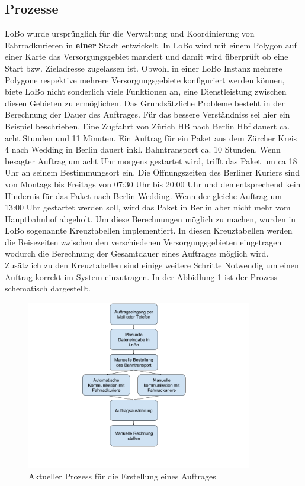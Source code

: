 \subsection{Prozesse}
\label{subsec:prozess}
LoBo wurde ursprünglich für die Verwaltung und Koordinierung von Fahrradkurieren in \textbf{einer} Stadt entwickelt. In LoBo wird mit einem Polygon auf einer Karte das Versorgungsgebiet markiert und damit wird überprüft ob eine Start bzw. Zieladresse zugelassen ist. Obwohl in einer LoBo Instanz mehrere Polygone respektive mehrere Versorgungsgebiete konfiguriert werden können, biete LoBo nicht sonderlich viele Funktionen an, eine Dienstleistung zwischen diesen Gebieten zu ermöglichen. Das Grundsätzliche Probleme besteht in der Berechnung der Dauer des Auftrages. Für das bessere Verständniss sei hier ein Beispiel beschrieben. Eine Zugfahrt von Zürich HB nach Berlin Hbf dauert ca. acht Stunden und 11 Minuten. Ein Auftrag für ein Paket aus dem Zürcher Kreis 4 nach Wedding in Berlin dauert inkl. Bahntransport ca. 10 Stunden. Wenn besagter Auftrag um acht Uhr morgens gestartet wird, trifft das Paket um ca 18 Uhr an seinem Bestimmungsort ein. Die Öffnungszeiten des Berliner Kuriers sind von Montags bis Freitags von 07:30 Uhr bis 20:00 Uhr und dementsprechend kein Hindernis für das Paket nach Berlin Wedding. Wenn der gleiche Auftrag um 13:00 Uhr gestartet werden soll, wird das Paket in Berlin aber nicht mehr vom Hauptbahnhof abgeholt. Um diese Berechnungen möglich zu machen, wurden in LoBo sogenannte Kreuztabellen implementiert. In diesen Kreuztabellen werden die Reisezeiten zwischen den verschiedenen Versorgungsgebieten eingetragen wodurch die Berechnung der Gesamtdauer eines Auftrages möglich wird. Zusätzlich zu den Kreuztabellen sind einige weitere Schritte Notwendig um einen Auftrag korrekt im System einzutragen. In der Abbidlung \ref{fig1:currentprocess} ist der Prozess schematisch dargestellt.

\begin{figure}[ht]
	\centering
  \includegraphics[width=0.88\textwidth]{images/currentProcess.png}
	\caption{Aktueller Prozess für die Erstellung eines Auftrages}
	\label{fig1:currentprocess}
\end{figure}

